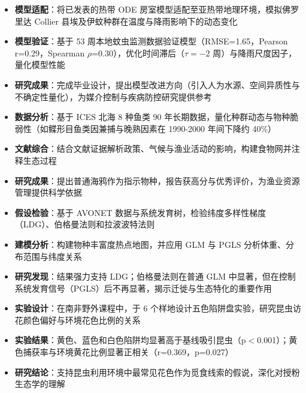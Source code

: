 \documentclass{my-resume}
\begin{document}
\begin{itemize}[parsep=0.2ex]
  \item \textbf{模型适配}：将已发表的热带 ODE 房室模型适配至亚热带地理环境，模拟佛罗里达 Collier 县埃及伊蚊种群在温度与降雨影响下的动态变化
  \item \textbf{模型验证}：基于 53 周本地蚊虫监测数据验证模型（RMSE=1.65，Pearson r=0.29，Spearman $\rho$=0.30），优化时间滞后（$\tau=-2$ 周）与降雨尺度因子，量化模型性能
  \item \textbf{研究成果}：完成毕业设计，提出模型改进方向（引入人为水源、空间异质性与不确定性量化），为媒介控制与疾病防控研究提供参考
\end{itemize}

\begin{itemize}[parsep=0.2ex]
  \item \textbf{数据分析}：基于 ICES 北海 8 种鱼类 90 年长期数据，量化种群动态与物种脆弱性（如鲽形目鱼类因兼捕与晚熟因素在 1990-2000 年间下降约 40\%）
  \item \textbf{文献综合}：结合文献证据解析政策、气候与渔业活动的影响，构建食物网并注释生态过程
  \item \textbf{研究成果}：提出普通海鸦作为指示物种，报告获高分与优秀评价，为渔业资源管理提供科学依据
\end{itemize}

\begin{itemize}[parsep=0.2ex]
  \item \textbf{假设检验}：基于 AVONET 数据与系统发育树，检验纬度多样性梯度（LDG）、伯格曼法则和拉波波特法则
  \item \textbf{建模分析}：构建物种丰富度热点地图，并应用 GLM 与 PGLS 分析体重、分布范围与纬度关系
  \item \textbf{研究发现}：结果强力支持 LDG；伯格曼法则在普通 GLM 中显著，但在控制系统发育信号（PGLS）后不再显著，揭示迁徙与生态特化的重要作用
\end{itemize}

\begin{itemize}[parsep=0.2ex]
  \item \textbf{实验设计}：在南非野外课程中，于 6 个样地设计五色陷阱盘实验，研究昆虫访花颜色偏好与环境花色比例的关系
  \item \textbf{实验结果}：黄色、蓝色和白色陷阱均显著高于基线吸引昆虫（p$<$0.001）；黄色捕获率与环境黄花比例显著正相关（r=0.369，p=0.027）
  \item \textbf{研究结论}：支持昆虫利用环境中最常见花色作为觅食线索的假说，深化对授粉生态学的理解
\end{itemize}
\end{document}
